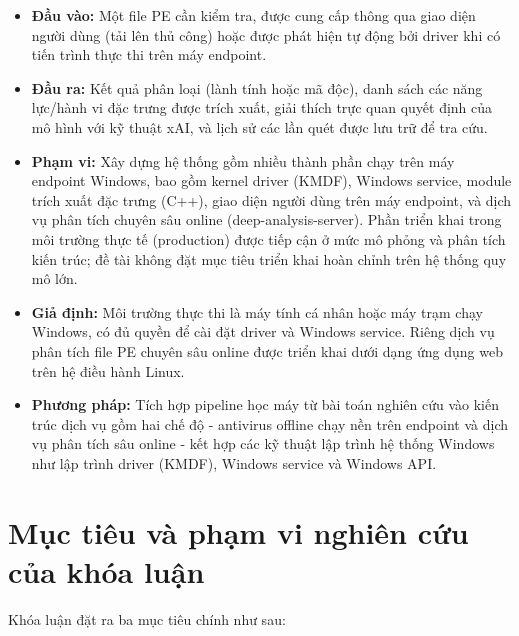 \begin{itemize}
    \item \textbf{Đầu vào:} Một file PE cần kiểm tra, được cung cấp
        thông qua giao diện người dùng (tải lên thủ công) hoặc được
        phát hiện tự động bởi driver khi có tiến trình thực thi trên
        máy endpoint.
    \item \textbf{Đầu ra:} Kết quả phân loại (lành tính hoặc mã độc),
        danh sách các năng lực/hành vi đặc trưng được trích xuất, giải
        thích trực quan quyết định của mô hình với kỹ thuật xAI, và
        lịch sử các lần quét được lưu trữ để tra cứu.
    \item \textbf{Phạm vi:} Xây dựng hệ thống gồm nhiều thành phần
        chạy trên máy endpoint Windows, bao gồm kernel driver (KMDF),
        Windows service, module trích xuất đặc trưng (C++), giao diện
        người dùng trên máy endpoint, và dịch vụ phân tích chuyên sâu
        online (deep-analysis-server). Phần triển khai trong môi trường thực tế
        (production) được tiếp cận ở mức mô phỏng và phân tích kiến
        trúc; đề tài không đặt mục tiêu triển khai hoàn chỉnh trên hệ
        thống quy mô lớn.
    \item \textbf{Giả định:} Môi trường thực thi là máy tính cá nhân
        hoặc máy trạm chạy Windows, có đủ quyền để cài đặt driver và
        Windows service. Riêng dịch vụ phân tích file PE chuyên sâu
        online được triển khai dưới dạng ứng dụng web trên hệ điều
        hành Linux.
    \item \textbf{Phương pháp:} Tích hợp pipeline học máy từ bài toán
        nghiên cứu vào kiến trúc dịch vụ gồm hai chế độ - antivirus
        offline chạy nền trên endpoint và dịch vụ phân tích sâu online
        - kết hợp các kỹ thuật lập trình hệ thống Windows như lập
        trình driver (KMDF), Windows service và Windows API.
\end{itemize}








\section*{Mục tiêu và phạm vi nghiên cứu của khóa luận}

Khóa luận đặt ra ba mục tiêu chính như sau:

